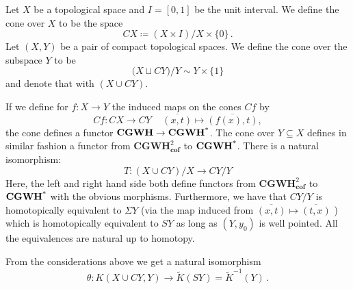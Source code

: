 \begin{definition}\label{def:kTheo-coneOverSubspace}
	Let $X$ be a topological space and $I=[0,1]$ be the unit interval. We define the cone over $X$ to be the space
	\begin{equation*}
		CX\coloneq (X\times I)\big/ X\times\{0\}\,.
	\end{equation*}
	Let $(X,Y)$ be a pair of compact topological spaces. We define the cone over the subspace $Y$ to be 
	\begin{equation*}
		\Big(X\sqcup CY\Big)\Big/ Y\sim Y\times \{ 1\}
	\end{equation*} and denote that with $(X\cup CY)$.
\end{definition}
\begin{proposition} \label{prop:kTheo-coneIsFunctorAndCYoverYIsRedSuspension}
	If we define for $f:X\to Y$ the induced maps on the cones $Cf$ by
	\begin{equation*}
		Cf:CX\to CY\,\quad \overline{(x,t)}\mapsto \overline{(f(x),t)},
	\end{equation*}the cone defines a functor $\operatorname{\mathbf{CGWH}}\to \operatorname{\mathbf{CGWH^*}}$. 
	The cone over $Y\subseteq X$ defines in similar fashion a functor from $\mathbf{CGWH}^2_{\mathbf{cof}}$ to $\operatorname{\mathbf{CGWH^*}}$.
	There is a natural isomorphism:
	\begin{equation*}
		T:(X\cup CY)\big/ X \to CY\big/Y
	\end{equation*} Here, the left and right hand side both define functors from $\mathbf{CGWH}^2_{\mathbf{cof}}$ to $\operatorname{\mathbf{CGWH^*}}$ with the obvious morphisms. Furthermore, we have that $CY\big/Y$ is homotopically equivalent to $\Sigma Y$ (via the map induced from $\overline{(x,t)}\mapsto \overline{(t,x)}$ ) which is homotopically equivalent to $SY$ as long as $(Y,y_0)$ is well pointed. All the equivalences are natural up to homotopy.  
\end{proposition}
\begin{corollary}
	From the considerations above we get a natural isomorphism 
	\begin{equation*}
		\theta: K(X\cup CY,Y)\to \tilde{K}(SY)=\tilde{K}^{-1}(Y)\,.
	\end{equation*}
\end{corollary}

